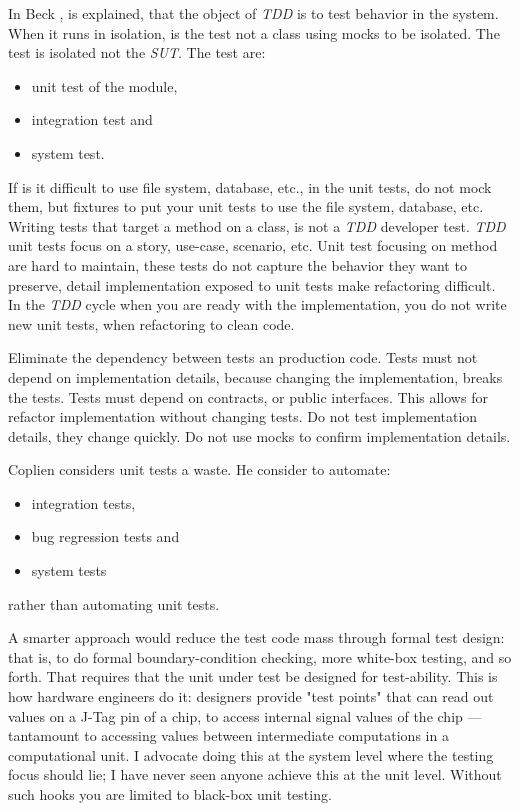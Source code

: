 \documentclass{article}
\begin{document}
In Beck \cite{beck2002driven}, is explained, that the object of \textit{TDD} is to test behavior in the system. When it runs in isolation, is the test not a class using mocks to be isolated. The test is isolated not the \textit{SUT}.
The test are:
\begin{itemize}
	\item unit test of the module,
	\item integration test and
	\item system test.
\end{itemize}

If is it difficult to use file system, database, etc., in the unit tests, do not mock them, but fixtures to put your unit tests to use the file system, database, etc. Writing tests that target a method on a class, is not a \textit{TDD} developer test. \textit{TDD} unit tests focus on a story, use-case, scenario, etc. Unit test focusing on method are hard to maintain, these tests do not capture the behavior they want to preserve, detail implementation exposed to unit tests make refactoring difficult. In the \textit{TDD} cycle when you are ready with the implementation, you do not write new unit tests, when refactoring to clean code.

Eliminate the dependency between tests an production code. Tests must not depend on implementation details, because changing the implementation, breaks the tests. Tests must depend on contracts, or public interfaces. This allows for refactor implementation without changing tests. Do not test implementation details, they change quickly. Do not use mocks to confirm implementation details.

Coplien \cite{WEBSITE:UnitTestIsWaste} considers unit tests a waste. He consider to automate:
\begin{itemize}
	\item integration tests, 
	\item bug regression tests and 
	\item system tests 
\end{itemize}
rather than automating unit tests. 

A smarter approach would reduce the test code mass through formal test design: that is, to do formal boundary-condition checking, more white-box testing, and so forth. That requires that the unit under test be designed for test-ability. This is how hardware engineers do it: designers provide "test points" that can read out values on a J-Tag pin of a chip, to access internal signal values of the chip — tantamount to accessing values between intermediate computations in a computational unit. I advocate doing this at the system level where the testing focus should lie; I have never seen anyone achieve this at the unit level. Without such hooks you are limited to black-box unit testing. 
\end{document}
